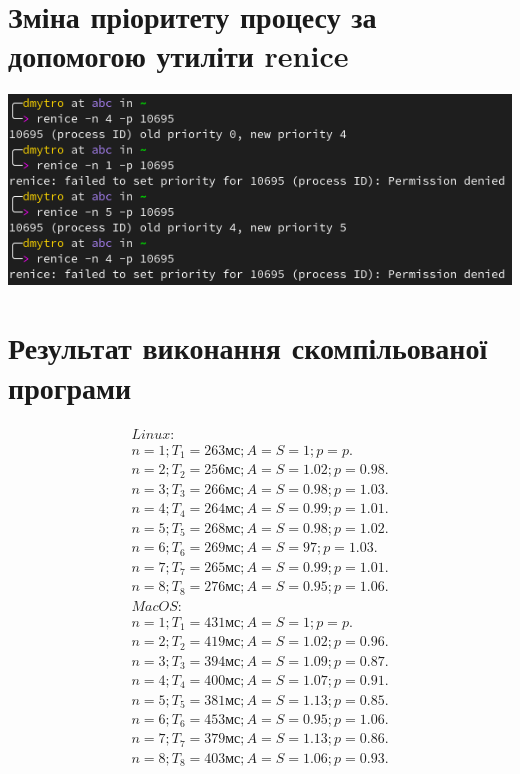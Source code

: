 \documentclass{article}
\begin{document}
\begin{normalsize}
	\section*{Зміна пріоритету процесу за допомогою утиліти renice}
	\begin{center}
		\includegraphics[scale=0.5]{renice}
	\end{center}
	\section*{Результат виконання скомпільованої програми}
	\begin{gather}
		Linux:\nonumber\\
		n=1; T_1=263\text{мс}; A=S=1; p=p.\nonumber\\
		n=2; T_2 =256\text{мс}; A=S=1.02; p=0.98.\nonumber\\
		n=3; T_3 =266\text{мс}; A=S=0.98; p=1.03.\nonumber\\
		n=4; T_4 =264\text{мс}; A=S=0.99; p=1.01.\nonumber\\
		n=5; T_5 =268\text{мс}; A=S=0.98; p=1.02.\nonumber\\
		n=6; T_6 =269\text{мс}; A=S=97; p=1.03.\nonumber\\
		n=7; T_7 =265\text{мс}; A=S=0.99; p=1.01.\nonumber\\
		n=8; T_8 =276\text{мс}; A=S=0.95; p=1.06.\nonumber\\
		MacOS:\nonumber\\
		n=1; T_1=431\text{мс}; A=S=1; p=p.\nonumber\\
		n=2; T_2 =419\text{мс}; A=S=1.02; p=0.96.\nonumber\\
		n=3; T_3 =394\text{мс}; A=S=1.09; p=0.87.\nonumber\\
		n=4; T_4 =400\text{мс}; A=S=1.07; p=0.91.\nonumber\\
		n=5; T_5 =381\text{мс}; A=S=1.13; p=0.85.\nonumber\\
		n=6; T_6 =453\text{мс}; A=S=0.95; p=1.06.\nonumber\\
		n=7; T_7 =379\text{мс}; A=S=1.13; p=0.86.\nonumber\\
		n=8; T_8 =403\text{мс}; A=S=1.06; p=0.93.\nonumber
	\end{gather}
	

\end{normalsize}
\end{document}

